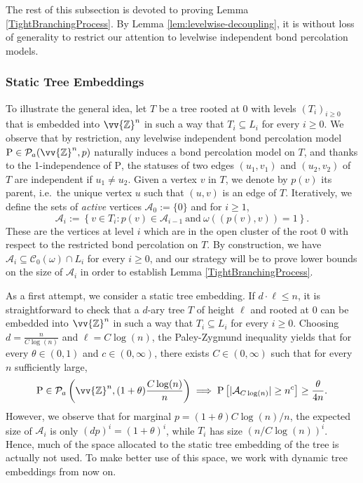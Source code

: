 \documentclass[11pt]{article}
\renewcommand{\P}{\mathrm{P}}
\newcommand{\Z}{\mathbb{Z}}
\newcommand{\A}{\mathcal{A}}
\DeclarePairedDelimiter{\abs}{\lvert}{\rvert}
\theoremstyle{remark}
\begin{document}
The rest of this subsection is devoted to proving Lemma \ref{TightBranchingProcess}. By Lemma \ref{lem:levelwise-decoupling}, it is without loss of generality to restrict our attention to levelwise independent bond percolation models. 

\subsubsection{Static Tree Embeddings}

To illustrate the general idea, let $T$ be a tree rooted at $0$ with levels $(T_i)_{i\ge 0}$ that is embedded into $\vv{\Z}^n$ in such a way that $T_i \subseteq L_i$ for every $i\ge 0$. We observe that by restriction, any levelwise independent bond percolation model $\P \in \mathcal{P}_a(\vv{\Z}^n,p)$ naturally induces a bond percolation model on $T$, and thanks to the 1-independence of $\P$, the statuses of two edges $(u_1,v_1)$ and $(u_2,v_2)$ of $T$ are independent if $u_1 \neq u_2$. 
 Given a vertex $v$ in $T$, we denote by $p(v)$ its parent, i.e.\ the unique vertex $u$ such that $(u,v)$ is an edge of $T$. Iteratively, we define the sets of \emph{active} vertices $\A_0 := \{0\}$ and for $i\ge 1$, 
\begin{equation}
    \A_i := \left\{v \in T_{i} : p(v) \in \A_{i-1}\ \text{and}\ \omega((p(v),v)) = 1 \right\}.
\end{equation}
These are the vertices at level $i$ which are in the open cluster of the root $0$ with respect to the restricted bond percolation on $T$. By construction, we have $\A_i \subseteq \mathcal C_0(\omega) \cap L_i$ for every $i\ge 0$, and our strategy will be to prove lower bounds on the size of $\A_i$ in order to establish Lemma \ref{TightBranchingProcess}. 

As a first attempt, we consider a static tree embedding. If $d \cdot \ell \leq n$, it is straightforward to check that a $d$-ary tree $T$ of height $\ell$ and rooted at $0$ can be embedded into $\vv{\Z}^n$ in such a way that $T_i \subseteq L_i$ for every $i\ge 0$. Choosing $d = \frac{n}{C\log(n)}$ and $\ell = C\log(n)$, the Paley-Zygmund inequality yields that for every $\theta \in (0,1)$ and $c \in (0,\infty)$, there exists $C \in (0,\infty)$ such that for every $n$ sufficiently large,
    \begin{equation} \label{eq:short-trees-first-attempt}
        \P \in \mathcal{P}_a\left(\vv{\Z}^n,(1 + \theta)\frac{C\log(n)}{n} \right) \implies \P\left[\abs{\A_{C\log(n)}} \ge n^c \right] \ge \frac{\theta}{4n}.
    \end{equation}
However, we observe that for marginal $p= (1 + \theta)C\log(n)/n$, the expected size of $\A_i$ is only $(dp)^i = (1+\theta)^{i}$, while $T_i$ has size $(n/C\log(n))^{i}$. Hence, much of the space allocated to the static tree embedding of the tree is actually not used. To make better use of this space, we work with dynamic tree embeddings from now on. 
\end{document}
